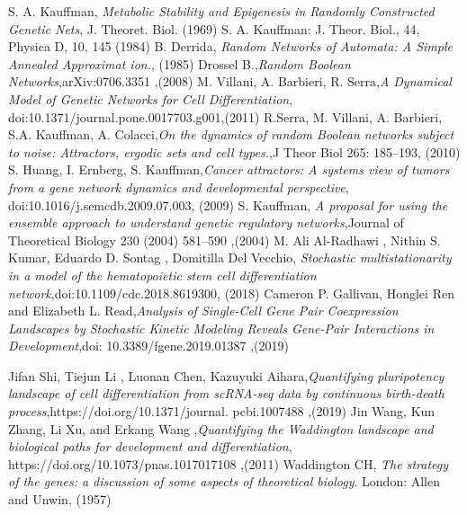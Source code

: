\begin{thebibliography}{90}             %
\rhead[\fancyplain{}{\bfseries \leftmark}]{\fancyplain{}{\bfseries
\thepage}}


 S. A. Kauffman, \emph{Metabolic Stability and Epigenesis in
Randomly Constructed Genetic Nets}, J. Theoret. Biol. (1969)
 S. A. Kauffman: J. Theor. Biol., 44, Physica D, 10, 145 (1984)
 B. Derrida, \emph{Random Networks of Automata: A Simple Annealed
Approximat ion.}, (1985)
 Drossel B.,\emph{Random Boolean Networks},arXiv:0706.3351 ,(2008)
 M. Villani, A. Barbieri, R. Serra,\emph{A Dynamical Model of Genetic Networks for Cell Differentiation}, doi:10.1371/journal.pone.0017703.g001,(2011)
 R.Serra, M. Villani, A. Barbieri, S.A. Kauffman, A. Colacci,\emph{On the dynamics of random Boolean networks subject to noise:
Attractors, ergodic sets and cell types.},J Theor Biol 265: 185–193, (2010)
 S. Huang, I. Ernberg, S. Kauffman,\emph{Cancer attractors: A systems view of tumors from a gene network
dynamics and developmental perspective}, doi:10.1016/j.semcdb.2009.07.003, (2009)
 S. Kauffman, \emph{A proposal for using the ensemble approach to understand
genetic regulatory networks},Journal of Theoretical Biology 230 (2004) 581–590 ,(2004)
 M. Ali Al-Radhawi , Nithin S. Kumar, Eduardo D. Sontag , Domitilla Del Vecchio, \emph{Stochastic multistationarity in a model of the hematopoietic
stem cell differentiation network},doi:10.1109/cdc.2018.8619300, (2018)
 Cameron P. Gallivan, Honglei Ren and Elizabeth L. Read,\emph{Analysis of Single-Cell Gene Pair
Coexpression Landscapes by
Stochastic Kinetic Modeling Reveals
Gene-Pair Interactions in
Development},doi: 10.3389/fgene.2019.01387 ,(2019)

 Jifan Shi, Tiejun Li , Luonan Chen, Kazuyuki Aihara,\emph{Quantifying pluripotency landscape of cell
differentiation from scRNA-seq data by
continuous birth-death process},https://doi.org/10.1371/journal.
pcbi.1007488 ,(2019)
 Jin Wang, Kun Zhang, Li Xu, and Erkang Wang ,\emph{Quantifying the Waddington landscape and biological
paths for development and differentiation}, https://doi.org/10.1073/pnas.1017017108 ,(2011)
 Waddington CH, \emph{The strategy of the genes: a discussion of some aspects of
theoretical biology}. London: Allen and Unwin, (1957)



\end{thebibliography}
